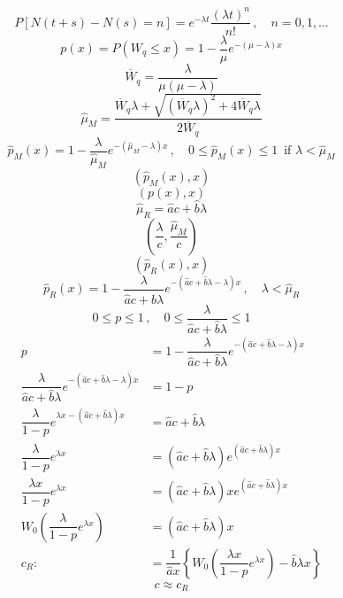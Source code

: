 \documentclass[hidelinks,14pt]{extarticle} %
\begin{document}
\[P[N(t+s) - N(s) = n] = e^{-\lambda t} \dfrac{(\lambda t)^n}{n!}\, , \quad n = 0, 1, \dots\]
\[p(x) = P(W_q\leq x) = 1 - \dfrac{\lambda}{\mu}e^{-(\mu-\lambda)x}\]
\[\overline{W}_q = \dfrac{\lambda}{\mu(\mu - \lambda)}\]
\[\widehat{\mu}_M = \dfrac{\overline{W}_q\lambda + \sqrt{(\overline{W}_q\lambda)^2 + 4\overline{W}_q\lambda}}{2 \overline{W}_q}\]
\[\widehat{p}_M(x) = 1 - \dfrac{\lambda}{\widehat{\mu}_M}e^{-(\widehat{\mu}_M - \lambda)x}\,, \quad 0\leq \widehat{p}_M(x) \leq 1\,\text{ if } \lambda< \widehat{\mu}_M\]
\[\left(\widehat{p}_M(x), x\right)\]
\[(p(x),x)\]
\[\widehat{\mu}_R = \widehat{a}c + \widehat{b}\lambda\]
\[\left(\dfrac{\lambda}{c},\dfrac{\widehat{\mu}_M}{c}\right)\]
\[\left(\widehat{p}_R(x),x\right)\]
\[\widehat{p}_R(x) = 1 - \dfrac{\lambda}{\widehat{a}c + \widehat{b}\lambda} e^{-\left(\widehat{a}c +\widehat{b}\lambda - \lambda\right)x}\,,\quad\lambda<\widehat{\mu}_R\]\pagebreak
\[0\leq p \leq 1\,, \quad0\leq\dfrac{\lambda}{\widehat{a}c + \widehat{b}\lambda}\leq1\]
\begin{align*}
	p &= 1 - \dfrac{\lambda}{\widehat{a}c + \widehat{b}\lambda} e^{-\left(\widehat{a}c +\widehat{b}\lambda - \lambda\right)x}\\
	\dfrac{\lambda}{\widehat{a}c + \widehat{b}\lambda} e^{-\left(\widehat{a}c +\widehat{b}\lambda - \lambda\right)x} &= 1 - p\\
	\dfrac{\lambda}{1-p}e^{\lambda x-\left(\widehat{a}c+\widehat{b}\lambda\right)x}&=\widehat{a}c+\widehat{b}\lambda\\
	\dfrac{\lambda}{1-p}e^{\lambda x} &= \left(\widehat{a}c+\widehat{b}\lambda\right)e^{\left(\widehat{a}c+\widehat{b}\lambda\right)x}\\
	\dfrac{\lambda x}{1-p}e^{\lambda x} &= \left(\widehat{a}c+\widehat{b}\lambda\right)xe^{\left(\widehat{a}c+\widehat{b}\lambda\right)x}\\
	W_0\left(\dfrac{\lambda}{1-p}e^{\lambda x}\right) &= \left(\widehat{a}c + \widehat{b}\lambda\right)x\\
	c_R :&= \dfrac{1}{\widehat{a}x}\left\{W_0\left(\dfrac{\lambda x}{1-p}e^{\lambda x}\right) - \widehat{b}\lambda x\right\}
\end{align*}
\[c\approx c_R\]
\end{document}
